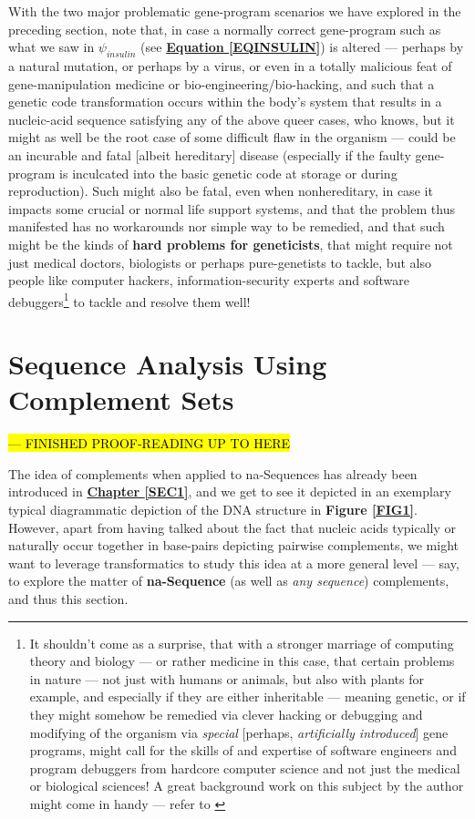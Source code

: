 \documentclass[a4paper, 18pt]{book} %
\begin{document}
With the two major problematic gene-program scenarios we have explored in the preceding section, note that, in case a normally correct gene-program such as what we saw in $\psi_{insulin}$ (see \textbf{\hyperref[EQINSULIN]{Equation \ref{EQINSULIN}}}) is altered --- perhaps by a natural mutation, or perhaps by a virus, or even in a totally malicious feat of gene-manipulation medicine or bio-engineering/bio-hacking, and such that a genetic code transformation occurs within the body's system that results in a nucleic-acid sequence satisfying any of the above queer cases, who knows, but it might as well be the root case of some difficult flaw in the organism --- could be an incurable and fatal [albeit hereditary] disease (especially if the faulty gene-program is inculcated into the basic genetic code at storage or during reproduction). Such might also be fatal, even when nonhereditary, in case it impacts some crucial or normal life support systems, and that the problem thus manifested has no workarounds nor simple way to be remedied, and that such might be the kinds of \textbf{hard problems for geneticists}, that might require not just medical doctors, biologists or perhaps pure-genetists to tackle, but also people like computer hackers, information-security experts and software debuggers\footnote{It shouldn't come as a surprise, that with a stronger marriage of computing theory and biology --- or rather medicine in this case, that certain problems in nature --- not just with humans or animals, but also with plants for example, and especially if they are either inheritable --- meaning genetic, or if they might somehow be remedied via clever hacking or debugging and modifying of the organism via \textit{special} [perhaps, \textit{artificially introduced}] gene programs, might call for the skills of and expertise of software engineers and program debuggers from hardcore computer science and not just the medical or biological sciences! A great background work on this subject by the author might come in handy --- refer to \cite{Lutalo2025debug}} to tackle and resolve them well!



\chapter{Sequence Analysis Using Complement Sets}
\label{SEC3A}


\hl{--- FINISHED PROOF-READING UP TO HERE}


The idea of complements when applied to na-Sequences has already been introduced in \textbf{\hyperref[SEC1]{Chapter \ref{SEC1}}}, and we get to see it depicted in an exemplary typical diagrammatic depiction of the DNA structure in \textbf{Figure \ref{FIG1}}. However, apart from having talked about the fact that nucleic acids typically or naturally occur together in base-pairs depicting pairwise complements, we might want to leverage transformatics to study this idea at a more general level --- say, to explore the matter of \textbf{na-Sequence} (as well as \textit{any sequence}) complements, and thus this section.
\end{document}
